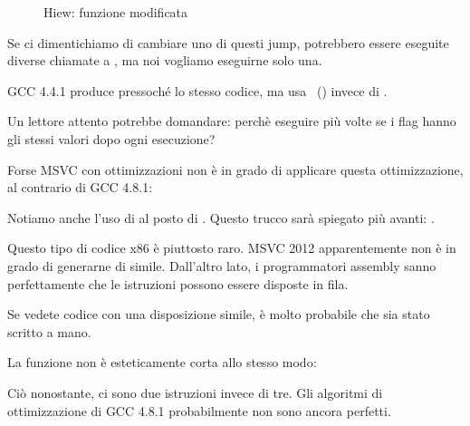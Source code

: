 \begin{figure}[H]
\centering
{}
\caption{Hiew: funzione  modificata}
\label{fig:jcc_hiew_2}
\end{figure}

Se ci dimentichiamo di cambiare uno di questi jump, potrebbero essere eseguite diverse chiamate a \printf, ma noi vogliamo eseguirne solo una.


\NonOptimizing GCC 4.4.1 
produce pressoché lo stesso codice, ma usa \puts~() invece di \printf.


Un lettore attento potrebbe domandare: perchè eseguire \CMP più volte se i flag hanno gli stessi valori dopo ogni esecuzione?

Forse MSVC con ottimizzazioni non è in grado di applicare questa ottimizzazione, al contrario di GCC 4.8.1:



Notiamo anche l'uso di  al posto di .
Questo trucco sarà spiegato più avanti: .

Questo tipo di codice x86 è piuttosto raro.
MSVC 2012 apparentemente non è in grado di generarne di simile.
Dall'altro lato, i programmatori assembly sanno perfettamente che le istruzioni  possono essere disposte in fila.

Se vedete codice con una disposizione simile, è molto probabile che sia stato scritto a mano.

La funzione  non è esteticamente corta allo stesso modo:



Ciò nonostante, ci sono due istruzioni  invece di tre.
Gli algoritmi di ottimizzazione di GCC 4.8.1 probabilmente non sono ancora perfetti. 
